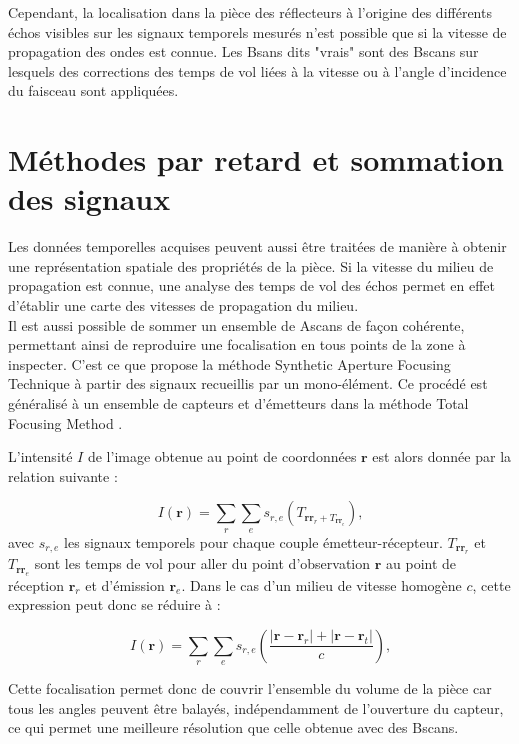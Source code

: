 Cependant, la localisation dans la pièce des réflecteurs à l'origine des différents échos visibles sur les signaux temporels mesurés n'est possible que si la vitesse de propagation des ondes est connue. Les Bsans dits "vrais" sont des Bscans sur lesquels des corrections des temps de vol liées à la vitesse ou à l'angle d'incidence du faisceau sont appliquées.


\section{Méthodes par retard et sommation des signaux}
Les données temporelles acquises peuvent aussi être traitées de manière à obtenir une représentation spatiale des propriétés de la pièce. Si la vitesse du milieu de propagation est connue, une analyse des temps de vol des échos permet en effet d'établir une carte des vitesses de propagation du milieu. \\

Il est aussi possible de sommer un ensemble de Ascans de façon cohérente, permettant ainsi de reproduire une focalisation en tous points de la zone à inspecter. C'est ce que propose la méthode Synthetic Aperture Focusing Technique \citep{doctor_saft} à partir des signaux recueillis par un mono-élément. Ce procédé est généralisé à un ensemble de capteurs et d'émetteurs dans la méthode Total Focusing Method \citep{holmes_tfm}. 

L'intensité $I$ de l'image obtenue au point de coordonnées $\bm{r}$ est alors donnée par la relation suivante : 

\begin{equation}
	I(\bm{r})= \displaystyle\sum_{r} \displaystyle\sum_{e} s_{r,e}\left( T_{\bm{r}\bm{r}_{r}+T_{\bm{r}\bm{r}_{e}}} \right) \text{,}	
\end{equation}
avec $s_{r,e}$ les signaux temporels pour chaque couple émetteur-récepteur. $T_{\bm{r}\bm{r}_{r}}$ et $T_{\bm{r}\bm{r}_{e}}$ sont les temps de vol pour aller du point d'observation $\bm{r}$ au point de réception $\bm{r}_{r} $ et d'émission $\bm{r}_{e}$. Dans le cas d'un milieu de vitesse homogène $c$, cette expression peut donc se réduire à :

\begin{equation}
	I(\bm{r})= \displaystyle\sum_{r} \displaystyle\sum_{e} s_{r,e}\left( \frac{|\bm{r} - \bm{r}_r| + |\bm{r} - \bm{r}_t|}{c}\right) \text{,}
\end{equation}

Cette focalisation permet donc de couvrir l'ensemble du volume de la pièce car tous les angles peuvent être balayés, indépendamment de l'ouverture du capteur, ce qui permet une meilleure résolution que celle obtenue avec des Bscans.\\






